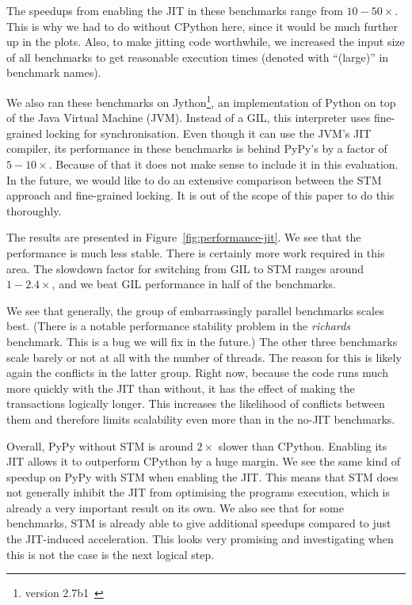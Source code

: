 \documentclass{sigplanconf}
\begin{document}
The speedups from enabling the JIT in these benchmarks range from
$10-50\times$. This is why we had to do without CPython here, since it
would be much further up in the plots. Also, to make jitting
code worthwhile, we increased the input size of all benchmarks to get
reasonable execution times (denoted with ``(large)'' in benchmark names).

We also ran these benchmarks on Jython\footnote{version
2.7b1~\cite{webjython}}, an implementation of Python on top of the
Java Virtual Machine (JVM).  Instead of a GIL, this interpreter uses
fine-grained locking for synchronisation. Even though it can use the
JVM's JIT compiler, its performance in these benchmarks is behind
PyPy's by a factor of $5-10\times$. Because of that it does not
make sense to include it in this evaluation. In the future, we would
like to do an extensive comparison between the STM approach and
fine-grained locking. It is out of the scope of this paper to do
this thoroughly.

The results are presented in Figure~\ref{fig:performance-jit}. We
see that the performance is much less stable. There is certainly more
work required in this area. The slowdown factor for switching from GIL
to STM ranges around $1-2.4\times$, and we beat GIL performance
in half of the benchmarks.

We see that generally, the group of embarrassingly parallel benchmarks
scales best. (There is a notable performance stability problem in the
\emph{richards} benchmark. This is a bug we will fix in the future.)
The other three benchmarks scale barely or not at all with the number of
threads. The reason for this is likely again the conflicts in the
latter group. Right now, because the code runs much more quickly with
the JIT than without, it has the effect of making the transactions
logically longer.  This increases the
likelihood of conflicts between them and therefore limits scalability
even more than in the no-JIT benchmarks.

Overall, PyPy without STM is around $2\times$ slower than CPython.
Enabling its JIT allows it to outperform CPython by a huge margin.
We see the same kind of speedup on PyPy with STM when enabling the
JIT. This means that STM does not generally inhibit the JIT from
optimising the programs execution, which is already a very important
result on its own. We also see that for some
benchmarks, STM is already able to give additional speedups
compared to just the JIT-induced acceleration. This looks very
promising and investigating when this is not the case is the next
logical step.
\end{document}
